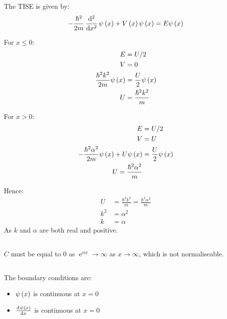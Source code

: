 \subsection{}
The TISE is given by:
\begin{equation*}
    - \frac{\hbar^2}{2m} \dod[2]{}{x} \psi \del{x} + V \del{x} \psi \del{x} = E \psi \del{x}
\end{equation*}

For $ x \leq 0 $:
\begin{align*}
    E & = U/2\\
    V & = 0\\
    \frac{\hbar^2 k^2}{2m} \psi \del{x} & = \frac{U}{2} \psi \del{x}\\
    U & = \frac{\hbar^2 k^2}{m}
\end{align*}

For $ x > 0 $:
\begin{align*}
    E & = U/2\\
    V & = U\\
    - \frac{\hbar^2 \alpha^2}{2m} \psi \del{x} + U \psi \del{x} & = \frac{U}{2} \psi \del{x}\\
    U = \frac{\hbar^2 \alpha^2}{m}
\end{align*}

Hence:
\begin{align*}
    U & = \frac{\hbar^2 k^2}{m} = \frac{\hbar^2 \alpha^2}{m}\\
    k^2 & = \alpha^2\\
    k & = \alpha
\end{align*}
As $ k $ and $ \alpha $ are both real and positive.

\subsection{}
$ C $ must be equal to $ 0 $ as $ \operatorname{e}^{\alpha x} \to \infty $ as $ x \to \infty $, which is not normaliseable.

\subsection{}
The boundary conditions are:
\begin{itemize}
    \item{$ \psi \del{x} $ is continuous at $ x = 0 $}
    \item{$ \od{\psi \del{x}}{x} $ is continuous at $ x = 0 $}
\end{itemize}

